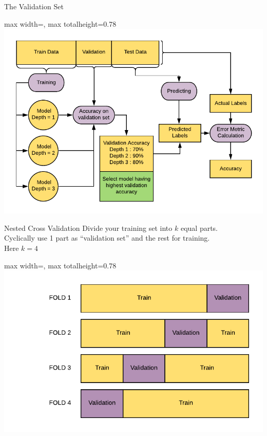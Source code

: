 \documentclass[aspectratio=169,10pt]{beamer}
\newcommand{\fitpic}[1]{\begin{adjustbox}{max width=\linewidth, max totalheight=0.78\textheight}#1\end{adjustbox}}
\begin{document}
	\begin{frame}{The Validation Set}
	\fitpic{\includegraphics[width = \textwidth]{../assets/bias-variance/diagrams/validation-workflow}}
	\end{frame}

	\begin{frame}{Nested Cross Validation}
	Divide your training set into $k$ equal parts.\\
	 Cyclically use 1 part as ``validation set'' and the rest for training.\\
	Here $k = 4$
	\begin{center}
	\fitpic{\includegraphics[scale=0.7]{../assets/bias-variance/diagrams/cross-validation}}
	\end{center}
	\end{frame}
\end{document}
